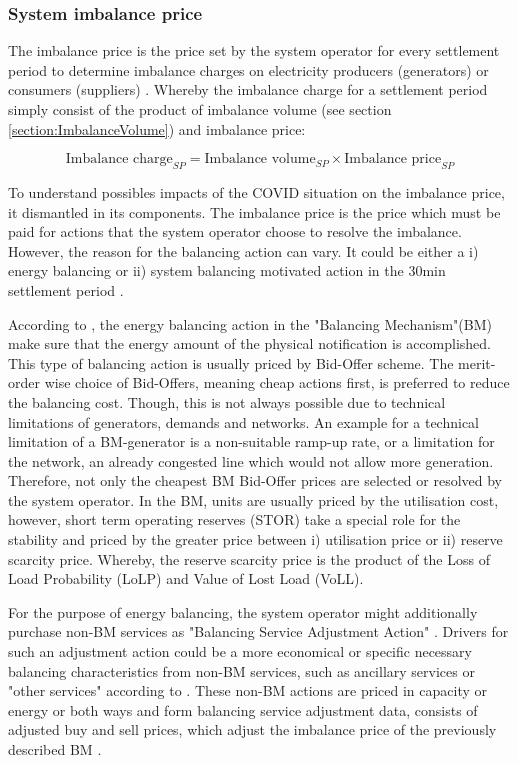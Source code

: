 \documentclass[energies,article,submit,moreauthors,pdftex]{Definitions/mdpi}
\begin{document}
\subsubsection{System imbalance price}\label{sec:system imbalance price}

The imbalance price is the price set by the system operator for every settlement period to determine imbalance charges on electricity producers (generators) or consumers (suppliers) \cite{ELEXON2019GuidanceBritain}. Whereby the imbalance charge for a settlement period simply consist of the product of imbalance volume (see section \ref{section:ImbalanceVolume}) and imbalance price:

\[ \text{Imbalance charge}_{SP} = \text{Imbalance volume}_{SP} \times \text{Imbalance price}_{SP} \]

To understand possibles impacts of the COVID situation on the imbalance price, it dismantled in its components. The imbalance price is the price which must be paid for actions that the system operator choose to resolve the imbalance. However, the reason for the balancing action can vary. It could be either a i) energy balancing or ii) system balancing motivated action in the 30min settlement period \cite{ELEXON2019GuidanceBritain}. 

According to \cite{ELEXON2019GuidanceBritain}, the energy balancing action in the "Balancing Mechanism"(BM) make sure that the energy amount of the physical notification is accomplished. This type of balancing action is usually priced by Bid-Offer scheme. The merit-order wise choice of Bid-Offers, meaning cheap actions first, is preferred to reduce the balancing cost. Though, this is not always possible due to technical limitations of generators, demands and networks. An example for a technical limitation of a BM-generator is a non-suitable ramp-up rate, or a limitation for the network, an already congested line which would not allow more generation. Therefore, not only the cheapest BM Bid-Offer prices are selected or resolved by the system operator. In the BM, units are usually priced by the utilisation cost, however, short term operating reserves (STOR) take a special role for the stability and priced by the greater price between i) utilisation price or ii) reserve scarcity price. Whereby, the reserve scarcity price is the product of the Loss of Load Probability (LoLP) and Value of Lost Load (VoLL). 

For the purpose of energy balancing, the system operator might additionally purchase non-BM services as "Balancing Service Adjustment Action" \cite{Nationalgrid2017ProcurementSO}. Drivers for such an adjustment action could be a more economical or specific necessary balancing characteristics from non-BM services, such as ancillary services or "other services" according to \cite{Nationalgrid2018BalancingStatement}. These non-BM actions are priced in capacity or energy or both ways and form balancing service adjustment data, consists of adjusted buy and sell prices, which adjust the imbalance price of the previously described BM \cite{Nationalgrid2017ProcurementSO,Nationalgrid2018BalancingStatement}.
\end{document}
